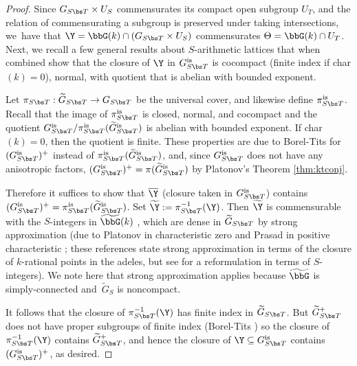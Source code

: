 \begin{proof} Since $G_{S\bs T}\times U_S$ commensurates its compact open subgroup $U_T$, and the relation of commensurating a subgroup is preserved under taking intersections, we~have that $\Y=\bbG(k)\cap (G_{S\bs T}\times U_S)$ commensurates $\Theta=\bbG(k)\cap U_T$. Next, we recall a few general results about $S$-arithmetic lattices that when combined show that the closure of $\Y$ in $G_{S\bs T}^{\textup{is}}$ is cocompact (finite index if char$(k)=0$), normal, with quotient that is abelian with bounded exponent.

Let $\pi_{S\bs T}:\widetilde{G}_{S\bs T}\to G_{S\bs T}$ be the universal cover, and likewise define $\pi_{S\bs T}^{\textup{is}}$. \hbox{Recall} that the image of $\pi_{S\bs T}^{\textup{is}}$ is closed, normal, and cocompact and the quotient $G_{S\bs T}^{\textup{is}}/\pi_{S\bs T}^{\textup{is}}(\widetilde{G}_{S\bs T}^{\textup{is}})$ is abelian with bounded exponent. If char$(k)=0$, then the quotient is finite. These properties are due to Borel-Tits \cite[3.19-20 \& 6.3]{borel-tits-morphismes-abstraits} for $(G_{S\bs T}^{\textup{is}})^+$ instead of $\pi_{S\bs T}^{\textup{is}}(\widetilde{G}_{S\bs T}^{\textup{is}})$, and, since $G_{S\bs T}^{\textup{is}}$ does not have any anisotropic factors, $(G_{S\bs T}^{\textup{is}})^+ = \pi(\widetilde{G}_{S\bs T}^{\textup{is}})$ by Platonov's Theorem \ref{thm:ktconj}.

Therefore it suffices to show that $\overline{\Y}$ (closure taken in $G_{S\bs T}^{\textup{is}}$) contains $(G_{S\bs T}^{\textup{is}})^+=\pi_{S\bs T}^{\textup{is}}(\widetilde{G}_{S\bs T}^{\textup{is}})$. Set $\widetilde{\Y}:=\pi_{S\bs T}^{-1}(\Y)$. Then $\widetilde{\Y}$ is commensurable with the $S$-integers in $\widetilde{\bbG}(k)$ \cite[I.3.2.9]{margulis-book}, which are dense in $\widetilde{G}_{S\bs T}$ by strong approximation (due to Platonov in characteristic zero \cite{platonov-strongapprox} and Prasad in positive characteristic \cite{prasad-strongapprox}; these references state strong approximation in terms of the closure of $k$-rational points in the adeles, but see \cite[Prop.\,7.2(2)]{platonov-rapinchuk-book} for a reformulation in terms of $S$-integers). We note here that strong approximation applies because $\widetilde{\bbG}$ is simply-connected and~$\widetilde{G}_S$ is noncompact.

It follows that the closure of $\pi_{S\bs T}^{-1}(\Y)$ has finite index in $\widetilde{G}_{S\bs T}$. But $\widetilde{G}_{S\bs T}^+$ does not have proper subgroups of finite index (Borel-Tits \cite[6.7]{borel-tits-morphismes-abstraits}) so the closure of $\pi_{S\bs T}^{-1}(\Y)$ contains $\widetilde{G}_{S\bs T}^+$, and hence the closure of $\Y\subseteq G_{S\bs T}^{\textup{is}}$ contains $(G_{S\bs T}^{\textup{is}})^+$, as desired.


\end{proof}
